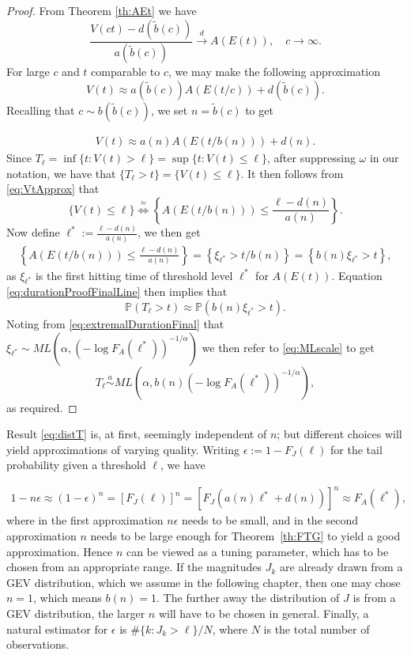 \documentclass[honours,12pt]{unswthesis}
\newcommand{\PP}{\mathbb{P}}
\newcommand{\1}{\mathbf 1}
\newcommand{\cd}{\overset{d}{\longrightarrow}}
\numberwithin{equation}{section}
\theoremstyle{definition}
\theoremstyle{remark}
\begin{document}
\begin{proof}
From Theorem \ref{th:AEt} we have
\[
	\frac{V(ct)-d(\tilde{b}(c))}{a(\tilde{b}(c))} \cd A(E(t)), \quad c\to\infty.
\]
For large $c$ and $t$ comparable to $c$, we may make the following approximation
\[
	V(t) \approx a(\tilde b(c)) A(E(t/c)) + d(\tilde b(c)). 
\]
Recalling that $c \sim b(\tilde b(c))$, we set $n = \tilde b(c)$
to get

\begin{align}\label{eq:VtApprox}
	V(t) \approx a(n) A(E(t/b(n))) + d(n). 
\end{align}
Since $T_\ell=\inf\{t: V(t) > \ell\}=\sup\{t: V(t) \leq \ell\}$, after suppressing $\omega$ in our notation, we have that $\{T_\ell>t\}=\{V(t) \leq \ell\}$. It then follows from \ref{eq:VtApprox} that 
\[
	\{V(t) \leq \ell\} \stackrel{\approx}{\Longleftrightarrow} \left\{A(E(t/b(n))) \leq \frac{\ell - d(n)}{a(n)}\right\}.
\]
Now define  $\ell^* := \frac{\ell - d(n)}{a(n)}$, we then get
\begin{align}\label{eq:durationProofFinalLine}
\left\{A(E(t/b(n))) \leq \frac{\ell - d(n)}{a(n)}\right\}=\left\{\xi_{\ell^*} > t/b(n)\right\}=\left\{b(n)\xi_{\ell^*} > t\right\},
\end{align}
as $\xi_{\ell^*}$ is the first hitting time of threshold level $\ell^*$ for $A(E(t))$. Equation \ref{eq:durationProofFinalLine} then implies that
\[
	\PP(T_\ell>t)\approx\PP(b(n)\xi_{\ell^*} > t).
\]
Noting from \ref{eq:extremalDurationFinal} that $\xi_{\ell^*} \sim ML\left(\alpha,(-\log F_A({\ell^*}))^{-1/\alpha}\right)$ we then refer to \ref{eq:MLscale} to get
\[
	T_\ell\overset{a}{\sim}ML\left(\alpha, b(n)(-\log F_A(\ell^*))^{-1/\alpha}\right),
\]
as required.
\end{proof}

Result \eqref{eq:distT} is, at first, seemingly independent of $n$; but
different choices will yield approximations of varying quality. Writing
$\epsilon := 1 - F_J(\ell)$ for the tail probability given a threshold
$\ell$, we have

\begin{align*}
1 - n \epsilon \approx (1 - \epsilon)^n
= [F_J(\ell)]^n
= \left[F_J(a(n) \ell^* + d(n))\right]^n
\approx F_A(\ell^*),
\end{align*}
where in the first approximation $n \epsilon$ needs to be small, 
and in the second approximation $n$ needs to be large enough for
Theorem~\ref{th:FTG} to yield a good approximation.
Hence $n$ can be viewed as a tuning parameter, which has to be chosen
from an appropriate range. 
If the magnitudes $J_k$ are already drawn from a GEV distribution,
which we assume in the following chapter,
then one may chose $n = 1$, which means $b(n) = 1$.
The further away the distribution of $J$ is from a GEV distribution, 
the larger $n$ will have to be chosen in general.
Finally, a natural estimator for $\epsilon$ is $\#\{k: J_k > \ell\}/N$,
where $N$ is the total number of observations. 
\end{document}
